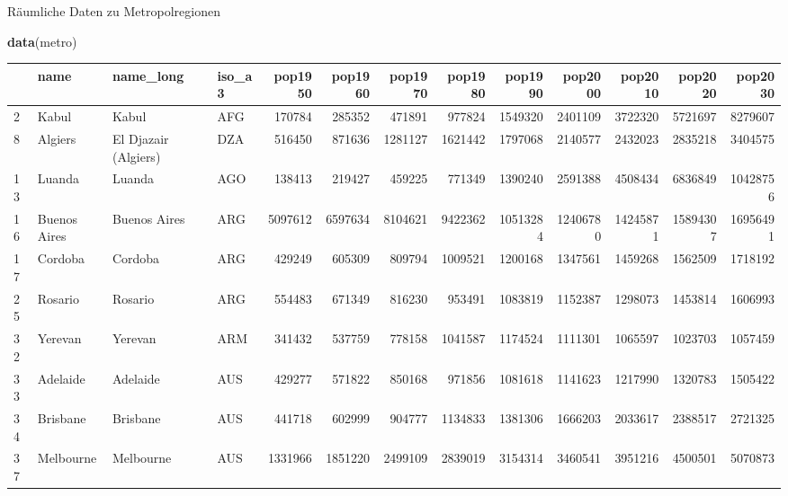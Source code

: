 \documentclass[ignorenonframetext,]{beamer}
\newenvironment{Shaded}{\begin{snugshade}}{\end{snugshade}}
\newcommand{\KeywordTok}[1]{\textcolor[rgb]{0.13,0.29,0.53}{\textbf{#1}}}
\newcommand{\NormalTok}[1]{#1}
\begin{document}
\begin{frame}[fragile]{Räumliche Daten zu Metropolregionen}

\begin{Shaded}
\begin{Highlighting}[]
\KeywordTok{data}\NormalTok{(metro)}
\end{Highlighting}
\end{Shaded}

\begin{longtable}[]{@{}llllrrrrrrrrr@{}}
\toprule
& name & name\_long & iso\_a3 & pop1950 & pop1960 & pop1970 & pop1980 &
pop1990 & pop2000 & pop2010 & pop2020 & pop2030\tabularnewline
\midrule
\endhead
2 & Kabul & Kabul & AFG & 170784 & 285352 & 471891 & 977824 & 1549320 &
2401109 & 3722320 & 5721697 & 8279607\tabularnewline
8 & Algiers & El Djazair (Algiers) & DZA & 516450 & 871636 & 1281127 &
1621442 & 1797068 & 2140577 & 2432023 & 2835218 & 3404575\tabularnewline
13 & Luanda & Luanda & AGO & 138413 & 219427 & 459225 & 771349 & 1390240
& 2591388 & 4508434 & 6836849 & 10428756\tabularnewline
16 & Buenos Aires & Buenos Aires & ARG & 5097612 & 6597634 & 8104621 &
9422362 & 10513284 & 12406780 & 14245871 & 15894307 &
16956491\tabularnewline
17 & Cordoba & Cordoba & ARG & 429249 & 605309 & 809794 & 1009521 &
1200168 & 1347561 & 1459268 & 1562509 & 1718192\tabularnewline
25 & Rosario & Rosario & ARG & 554483 & 671349 & 816230 & 953491 &
1083819 & 1152387 & 1298073 & 1453814 & 1606993\tabularnewline
32 & Yerevan & Yerevan & ARM & 341432 & 537759 & 778158 & 1041587 &
1174524 & 1111301 & 1065597 & 1023703 & 1057459\tabularnewline
33 & Adelaide & Adelaide & AUS & 429277 & 571822 & 850168 & 971856 &
1081618 & 1141623 & 1217990 & 1320783 & 1505422\tabularnewline
34 & Brisbane & Brisbane & AUS & 441718 & 602999 & 904777 & 1134833 &
1381306 & 1666203 & 2033617 & 2388517 & 2721325\tabularnewline
37 & Melbourne & Melbourne & AUS & 1331966 & 1851220 & 2499109 & 2839019
& 3154314 & 3460541 & 3951216 & 4500501 & 5070873\tabularnewline
\bottomrule
\end{longtable}

\end{frame}
\end{document}
